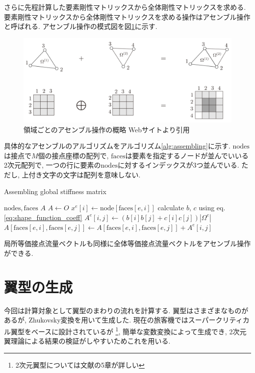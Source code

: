 \documentclass{ltjsarticle}
\begin{document}
さらに先程計算した要素剛性マトリックスから全体剛性マトリックスを求める.
要素剛性マトリックスから全体剛性マトリックスを求める操作はアセンブル操作と呼ばれる.
アセンブル操作の模式図を図\ref{fig:assembling}に示す.
\begin{figure}[htbp]
    \centering
    \includegraphics[width=12cm]{assembling.png}
    \caption{領域ごとのアセンブル操作の概略  Webサイト\cite{Morita2018}より引用}
    \label{fig:assembling}
\end{figure}
具体的なアセンブルのアルゴリズムをアルゴリズム\ref{alg:assembling}に示す.
$\mathrm{nodes}$は接点で$M$個の接点座標の配列で,
$\mathrm{faces}$は要素を指定するノードが並んでいいる2次元配列で,
一つの行に要素の$\mathrm{nodes}$に対するインデックスが3つ並んでいる.
ただし, 上付き文字の文字は配列を意味しない.
\begin{algorithm}
    \caption{Assembling global stiffness matrix}
    \label{alg:assembling}
    \begin{algorithmic}
        \Require $\mathrm{nodes}, \mathrm{faces}$
        \Ensure $A$
        \State $A \leftarrow O$
                \State $x^e[i]\leftarrow \mathrm{node}[\mathrm{faces}[e, i]]$    
            \EndFor
            \State calculate $b$, $c$ using eq. \eqref{eq:shape_function_coeff}
                \State $A^e[i,j] \leftarrow (b[i]b[j]+c[i]c[j])|\Omega^e|$
            \EndFor 
                \State $A[\mathrm{faces}[e,i],\mathrm{faces}[e,j]] \leftarrow A[\mathrm{faces}[e,i],\mathrm{faces}[e,j]] + A^e[i,j]$
            \EndFor
        \EndFor
    \end{algorithmic}
\end{algorithm}

局所等価接点流量ベクトルも同様に全体等価接点流量ベクトルをアセンブル操作ができる.

\section{翼型の生成}
今回は計算対象として翼型のまわりの流れを計算する. 
翼型はさまざまなものがあるが, Zhukovsky変換を用いて生成した. 
現在の旅客機ではスーパークリティカル翼型をベースに設計されているが
\cite{Rinoie2011}\footnote{2次元翼型については文献\cite{Rinoie2011}の5章が詳しい},
簡単な変数変換によって生成でき, 
2次元翼理論による結果の検証がしやすいためこれを用いる.
\end{document}
